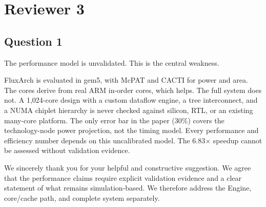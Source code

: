 \section{Reviewer 3}

\subsection{Question 1}
\begin{reviewcomment}
The performance model is unvalidated. This is the central weakness.

FluxArch is evaluated in gem5, with McPAT and CACTI for power and area. The cores derive from real ARM in-order cores, which helps. The full system does not. A 1,024-core design with a custom dataflow engine, a tree interconnect, and a NUMA chiplet hierarchy is never checked against silicon, RTL, or an existing many-core platform. The only error bar in the paper (30\%) covers the technology-node power projection, not the timing model. Every performance and efficiency number depends on this uncalibrated model. The 6.83$\times$ speedup cannot be assessed without validation evidence.
\end{reviewcomment}
We sincerely thank you for your helpful and constructive suggestion. We agree that the performance claims require explicit validation evidence and a clear statement of what remains simulation-based. We therefore address the Engine, core/cache path, and complete system separately.

